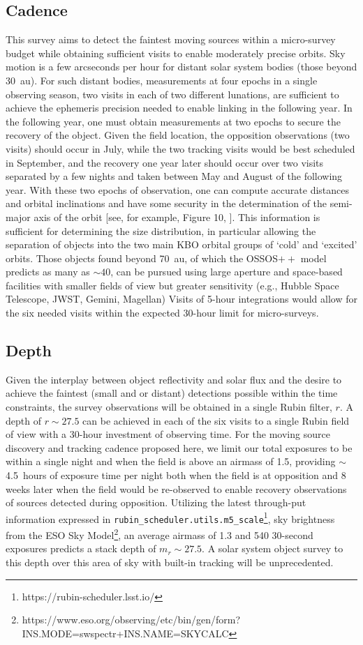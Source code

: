 \documentclass[modern,preprint]{aastex7}
\begin{document}
\subsection{Cadence}
This survey aims to detect the faintest moving sources within a micro-survey budget while obtaining sufficient visits to enable moderately precise orbits.
Sky motion is a few arcseconds per hour for distant solar system bodies (those beyond 30~au). 
For such distant bodies, measurements at four epochs in a single observing season, two visits in each of two different lunations, are sufficient to achieve the ephemeris precision needed to enable linking in the following year.  
In the following year, one must obtain measurements at two epochs to secure the recovery of the object.  
Given the field location, the opposition observations (two visits) should occur in July, while the two tracking visits would be best scheduled in September, and the recovery one year later should occur over two visits separated by a few nights and taken between May and August of the following year. 
With these two epochs of observation, one can compute accurate distances and orbital inclinations and have some security in the determination of the semi-major axis of the orbit [see, for example, Figure 10, \citet{Bannister2016}].
This information is sufficient for determining the size distribution, in particular allowing the separation of objects into the two main KBO orbital groups of `cold' and `excited' orbits.
Those objects found beyond 70~au, of which the OSSOS$++$ model predicts as many as $\sim40$, can be pursued using large aperture and space-based facilities with smaller fields of view but greater sensitivity (e.g., Hubble Space Telescope, JWST, Gemini, Magellan) 
Visits of 5-hour integrations would allow for the six needed visits within the expected 30-hour limit for micro-surveys. 

\subsection{Depth}
Given the interplay between object reflectivity and solar flux and the desire to achieve the faintest (small and or distant) detections possible within the time constraints, the survey observations will be obtained in a single Rubin filter, $r$.
A depth of $r\sim 27.5$ can be achieved in each of the six visits to a single Rubin field of view with a 30-hour investment of observing time.
For the moving source discovery and tracking cadence proposed here, we limit our total exposures to be within a single night and when the field is above an airmass of 1.5, providing $\sim$4.5~hours of exposure time per night both when the field is at opposition and 8 weeks later when the field would be re-observed to enable recovery observations of sources detected during opposition.
Utilizing the latest through-put information expressed in \texttt{rubin\_scheduler.utils.m5\_scale}\footnote{https://rubin-scheduler.lsst.io/}, sky brightness from the ESO Sky Model\footnote{https://www.eso.org/observing/etc/bin/gen/form?INS.MODE=swspectr+INS.NAME=SKYCALC}, an average airmass of 1.3 and 540 30-second exposures predicts a stack depth of $m_r \sim 27.5$.
A solar system object survey to this depth over this area of sky with built-in tracking will be unprecedented.
\end{document}
